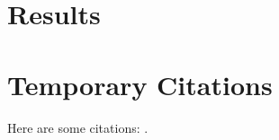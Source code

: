 \documentclass{article}
\begin{document}
	\section{Results}

    \section{Temporary Citations}
    Here are some citations: \cite{Axelrod1981}\cite{Nowak1992}\cite{Hauert2004}\cite{Pacheco2005}\cite{Santos2006b}\cite{Santos2006a}\cite{Santos2005a}\cite{Santos2006c}\cite{Santos2005b}\cite{Eguiluz2005}\cite{Santos2006d}\cite{Fu2008}\cite{Traulsen2006}\cite{Watts1998}\cite{Barabasi1999}\cite{Amaral2000}\cite{Molloy1995}\cite{Maslov2002}\cite{Dorogovtsev2003}\cite{Dorogovtsev2001}\cite{Nowak1998}\cite{Boyd1988}\cite{Boyd1992}\cite{Hauert2002}\cite{Hauert2007}\cite{Li2014}\cite{Maloney2015a}\cite{Ohtsuki2006}\cite{Macy1991}.
    
    
    
\end{document}
